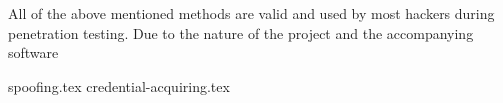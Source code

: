 \documentclass{article}
\begin{document}



All of the above mentioned methods are valid and used by most hackers during penetration testing. Due to the nature of the project and the accompanying software


{spoofing.tex}
{credential-acquiring.tex}
\end{document}
